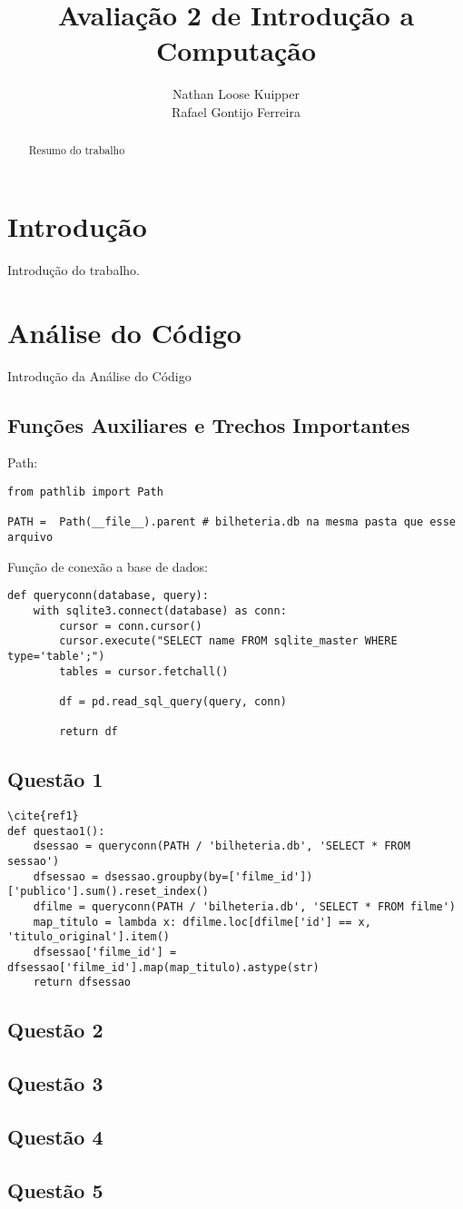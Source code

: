 \documentclass{article}
\title{Avaliação 2 de Introdução a Computação}
\author{Nathan Loose Kuipper \\ Rafael Gontijo Ferreira}
\begin{document}
\maketitle

\begin{abstract}
Resumo do trabalho %
\end{abstract}

\section{Introdução}
Introdução do trabalho.

\section{Análise do Código}
Introdução da Análise do Código
\subsection*{Funções Auxiliares e Trechos Importantes}

Path:
\begin{lstlisting}
from pathlib import Path

PATH =  Path(__file__).parent # bilheteria.db na mesma pasta que esse arquivo
\end{lstlisting}
Função de conexão a base de dados:
\begin{lstlisting}
def queryconn(database, query):
    with sqlite3.connect(database) as conn:
        cursor = conn.cursor()
        cursor.execute("SELECT name FROM sqlite_master WHERE type='table';")
        tables = cursor.fetchall()
      
        df = pd.read_sql_query(query, conn)
        
        return df
\end{lstlisting}
\subsection*{Questão 1}
\begin{lstlisting}
\cite{ref1}
def questao1():
    dsessao = queryconn(PATH / 'bilheteria.db', 'SELECT * FROM sessao')
    dfsessao = dsessao.groupby(by=['filme_id'])['publico'].sum().reset_index()
    dfilme = queryconn(PATH / 'bilheteria.db', 'SELECT * FROM filme')
    map_titulo = lambda x: dfilme.loc[dfilme['id'] == x, 'titulo_original'].item()
    dfsessao['filme_id'] =  dfsessao['filme_id'].map(map_titulo).astype(str)
    return dfsessao
\end{lstlisting}
\subsection*{Questão 2}
\subsection*{Questão 3}
\subsection*{Questão 4}
\subsection*{Questão 5}



\end{document}

